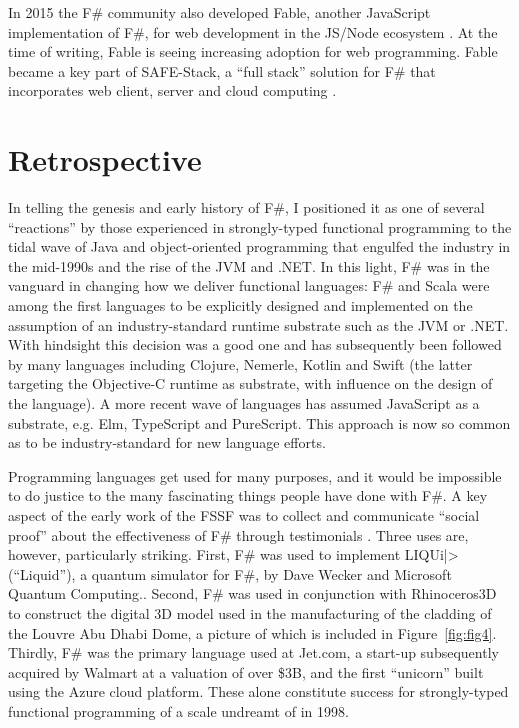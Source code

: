 \documentclass[acmsmall,screen]{acmart}
\begin{document}
In 2015 the F\# community also developed Fable, another JavaScript implementation of F\#, for web development
in the JS/Node ecosystem \citep{GarciaCaro2018}. At the time of writing, Fable is seeing increasing adoption for web
programming.  Fable became a key part of SAFE-Stack, a “full stack” solution for F\# that incorporates web client, server and cloud
computing \citep{Abraham2020}.


\section*{Retrospective}

In telling the genesis and early history of F\#, I positioned it as one of several “reactions” by those experienced
in strongly-typed functional programming to the tidal wave of Java and object-oriented programming that
engulfed the industry in the mid-1990s and the rise of the JVM and .NET.  In this light, F\# was in the vanguard
in changing how we deliver functional languages: F\# and Scala were among the first languages to be explicitly
designed and implemented on the assumption of an industry-standard runtime substrate such as the JVM or .NET.
With hindsight this decision was a good one and has subsequently been followed by many languages including
Clojure, Nemerle, Kotlin and Swift (the latter targeting the Objective-C runtime as substrate, with influence on the design of the language). A more recent
wave of languages has assumed JavaScript as a substrate, e.g. Elm, TypeScript and PureScript.  This approach is
now so common as to be industry-standard for new language efforts.

Programming languages get used for many purposes, and it would be impossible to do justice to the many fascinating
things people have done with F\#.  A key aspect of the early work of the FSSF was to collect and communicate
“social proof” about the effectiveness of F\# through testimonials \citep{FSharpTestimonials}.
Three uses are, however, particularly striking.
First, F\# was used to implement LIQUi|> (“Liquid”), a quantum simulator for F\#, by Dave Wecker and Microsoft
Quantum Computing.\citep{RefLiquid}. Second, F\# was used in conjunction with Rhinoceros3D to construct the digital 3D model
used in the manufacturing of the cladding of the Louvre Abu Dhabi Dome, a picture of which is included in Figure~\ref{fig:fig4}.
Thirdly, F\# was the primary language used at Jet.com, a start-up subsequently acquired by Walmart at a valuation
of over \$3B, and the first “unicorn” built using the Azure cloud platform. These alone constitute success for
strongly-typed functional programming of a scale undreamt of in 1998.
\end{document}
